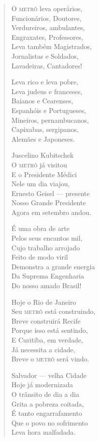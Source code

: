 \begin{verse}
O \textsc{metrô} leva operários, \\
Funcionários, Doutores, \\
Verdureiros, ambulantes, \\
Engraxates, Professores, \\
Leva também Magistrados, \\
Jornalistas e Soldados, \\
Lavadeiras, Cantadores! 

Leva rico e leva pobre, \\
Leva judeus e franceses, \\
Baianos e Cearenses, \\
Espanhóis e Portugueses, \\
Mineiros, pernambucanos, \\
Capixabas, sergipanos, \\
Alemães e Japoneses. 

Juscelino Kubitschek \\
O \textsc{metrô} já visitou \\
E o Presidente Médici \\
Nele um dia viajou, \\
Ernesto Geisel ---  presente \\
Nosso Grande Presidente \\
Agora em setembro andou. 


É uma obra de arte \\
Pelos seus encantos mil, \\
Cujo trabalho arrojado \\
Feito de modo viril \\
Demonstra a grande energia \\
Da Suprema Engenharia \\
Do nosso amado Brasil! 

Hoje o Rio de Janeiro \\
Seu \textsc{metrô} está construindo, \\
Breve construirá Recife \\
Porque isso está sentindo, \\
E Curitiba, em verdade, \\
Já necessita a cidade, \\
Breve o \textsc{metrô} será vindo. 

Salvador ---  velha Cidade \\
Hoje já modernizada \\
O trânsito de dia a dia \\
Grita a pobreza coitada, \\
É tanto engarrafamento \\
Que o povo no sofrimento \\
Leva hora malfadada. 


\end{verse}
